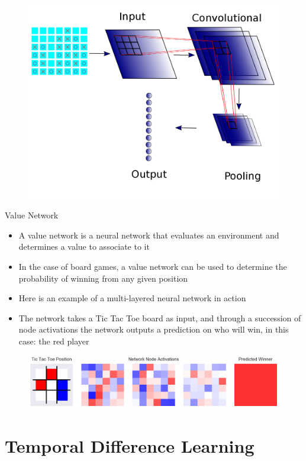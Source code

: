\begin{frame}
\begin{figure}
\includegraphics[width=0.8 \textwidth]{"CNN"}
\end{figure}
\end{frame}

\begin{frame}[plain]{Value Network}
\begin{itemize}
\item A value network is a neural network that evaluates an environment and determines a value to associate to it
\item In the case of board games, a value network can be used to determine the probability of winning from any given position
\item Here is an example of a multi-layered neural network in action
\item The network takes a Tic Tac Toe board as input, and through a succession of node activations the network outputs a prediction on who will win, in this case: the red player
\end{itemize}
\begin{figure}
\includegraphics[width=1. \textwidth]{network_weights}
\end{figure}
\end{frame}

\section{Temporal Difference Learning}

